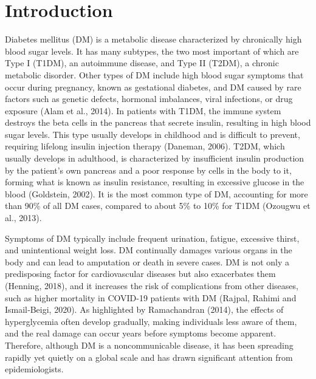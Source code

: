\chapter{Introduction}
\label{chap:1}

Diabetes mellitus (DM) is a metabolic disease characterized by chronically high blood sugar levels. It has many subtypes, the two most important of which are Type I (T1DM), an autoimmune disease, and Type II (T2DM), a chronic metabolic disorder. Other types of DM include high blood sugar symptoms that occur during pregnancy, known as gestational diabetes, and DM caused by rare factors such as genetic defects, hormonal imbalances, viral infections, or drug exposure (Alam et al., 2014). In patients with T1DM, the immune system destroys the beta cells in the pancreas that secrete insulin, resulting in high blood sugar levels. This type usually develops in childhood and is difficult to prevent, requiring lifelong insulin injection therapy (Daneman, 2006). T2DM, which usually develops in adulthood, is characterized by insufficient insulin production by the patient's own pancreas and a poor response by cells in the body to it, forming what is known as insulin resistance, resulting in excessive glucose in the blood (Goldstein, 2002). It is the most common type of DM, accounting for more than 90\% of all DM cases, compared to about 5\% to 10\% for T1DM (Ozougwu et al., 2013).

Symptoms of DM typically include frequent urination, fatigue, excessive thirst, and unintentional weight loss. DM continually damages various organs in the body and can lead to amputation or death in severe cases. DM is not only a predisposing factor for cardiovascular diseases but also exacerbates them (Henning, 2018), and it increases the risk of complications from other diseases, such as higher mortality in COVID-19 patients with DM (Rajpal, Rahimi and Ismail‐Beigi, 2020). As highlighted by Ramachandran (2014), the effects of hyperglycemia often develop gradually, making individuals less aware of them, and the real damage can occur years before symptoms become apparent. Therefore, although DM is a noncommunicable disease, it has been spreading rapidly yet quietly on a global scale and has drawn significant attention from epidemiologists.


